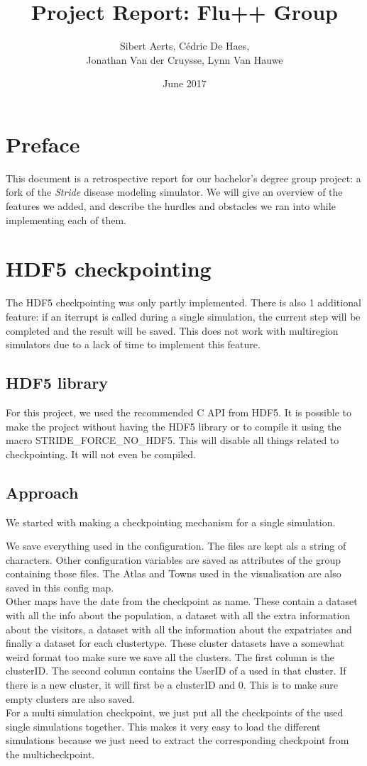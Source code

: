 \documentclass[a4paper,12pt]{article}
\title{Project Report: Flu++ Group}
\author{Sibert Aerts, C\'edric De Haes,\\ Jonathan Van der Cruysse, Lynn Van Hauwe}
\date{June 2017}
\begin{document}
\maketitle
\section*{Preface}
This document is a retrospective report for our bachelor's degree group project: a fork of the \emph{Stride} disease modeling simulator. \autocite{bachelorproef} We will give an overview of the features we added, and describe the hurdles and obstacles we ran into while implementing each of them.

\tableofcontents
\pagebreak

\section{HDF5 checkpointing}
The HDF5 checkpointing was only partly implemented. There is also 1 additional feature: if an iterrupt is called during a single simulation, the current step will be completed and the result will be saved. This does not work with multiregion simulators due to a lack of time to implement this feature.

\subsection{HDF5 library}
For this project, we used the recommended C API from HDF5.
It is possible to make the project without having the HDF5 library or to compile it using the macro STRIDE\_FORCE\_NO\_HDF5. This will disable all things related to checkpointing. It will not even be compiled.

\subsection{Approach}
We started with making a checkpointing mechanism for a single simulation.

We save everything used in the configuration. The files are kept als a string of characters. Other configuration variables are saved as attributes of the group containing those files. The Atlas and Towns used in the visualisation are also saved in this config map.
\\
Other maps have the date from the checkpoint as name. These contain a dataset with all the info about the population, a dataset with all the extra information about the visitors, a dataset with all the information about the expatriates and finally a dataset for each clustertype. These cluster datasets have a somewhat weird format too make sure we save all the clusters. The first column is the clusterID. The second column contains the UserID of a used in that cluster. If there is a new cluster, it will first be a clusterID and 0. This is to make sure empty clusters are also saved.
\\
For a multi simulation checkpoint, we just put all the checkpoints of the used single simulations together. This makes it very easy to load the different simulations because we just need to extract the corresponding checkpoint from the multicheckpoint.
\end{document}
